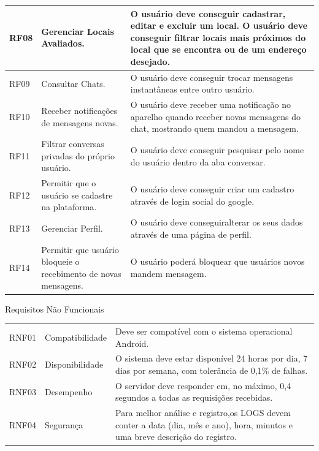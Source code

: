 \begin{longtable}{|p{2.0cm}|p{6.5cm}|p{6.5cm}|}
	\hline
	RF08 & Gerenciar Locais Avaliados. & O usuário deve conseguir cadastrar, editar e excluir um local. O usuário deve conseguir filtrar locais mais próximos do local que se encontra ou de um endereço desejado. \\
	\hline
	RF09 & Consultar Chats.   &O usuário deve conseguir trocar mensagens instantâneas entre outro usuário.\\
	\hline
	RF10 &Receber notificações de mensagens novas. &
	O usuário deve receber uma notificação no aparelho quando receber novas mensagens do chat, mostrando quem mandou a mensagem.\\
	\hline
	RF11 & Filtrar conversas privadas do próprio usuário.  & O usuário deve conseguir pesquisar pelo nome do usuário dentro da aba conversar.\\
	\hline
	RF12 & Permitir que o usuário se cadastre na plataforma. & O usuário deve conseguir criar um cadastro através de login social do google.\\
	\hline
	RF13 & Gerenciar Perfil.  &
	O usuário deve conseguiralterar os seus dados através de uma página de perfil.  \\
	\hline
	RF14 & Permitir que usuário bloqueie o recebimento de novas mensagens.  & O usuário poderá bloquear que usuários novos mandem mensagem.\\
	\hline
\end{longtable}

\begin{quadro}[htb]
	\centering
	\ABNTEXfontereduzida
	\caption[Requisitos Não Funcionais]{Requisitos Não Funcionais}
	\label{requisitos-nao-funcionais}
	\begin{tabular}{|p{2.0cm}|p{6.5cm}|p{6.5cm}|}
		\hline
		\thead{Código} & \thead{Categoria}  & \thead{Requisito} \\
		\hline
		RNF01 & Compatibilidade &
		Deve ser compatível com o sistema operacional Android.\\
		\hline
		RNF02 & Disponibilidade & O sistema deve estar disponível 24 horas por dia, 7 dias por semana, com tolerância de 0,1\% de falhas. \\
		\hline
		RNF03 & Desempenho & O servidor deve responder em, no máximo, 0,4 segundos a todas as requisições recebidas. \\
		\hline
		RNF04 & Segurança & Para melhor análise e registro,os LOGS devem conter a data (dia, mês e ano), hora, minutos e uma breve descrição do registro.\\
		\hline
	\end{tabular}
\end{quadro}

